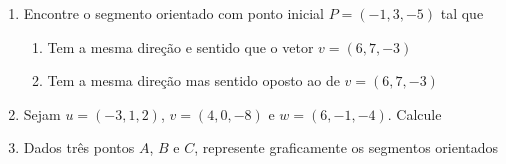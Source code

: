 \documentclass[a4paper,5pt]{amsbook}
\begin{document}
\begin{enumerate}
	\vspace{0.5cm}
	\item Encontre o segmento orientado com ponto inicial $P = (-1, 3, -5)$ tal
		que
		\begin{enumerate}
			\item Tem a mesma dire\c{c}\~ao e sentido que o vetor $v = (6, 7, -3)$
			\item Tem a mesma dire\c{c}\~ao mas sentido oposto ao de $v = (6, 7, -3)$
		\end{enumerate}

	\vspace{0.5cm}
	\item Sejam $u = (-3, 1, 2)$, $v = (4, 0, -8)$ e $w = (6, -1, -4)$. Calcule


	\vspace{0.5cm}
	\item Dados tr\^es pontos $A$, $B$ e $C$, represente graficamente os
		segmentos orientados


\end{enumerate}
\end{document}
